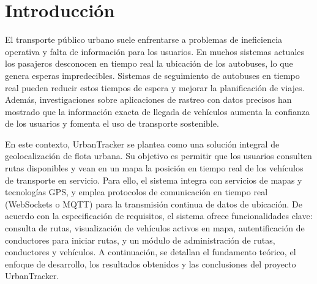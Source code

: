 \section{Introducción}
El transporte público urbano suele enfrentarse a problemas de ineficiencia operativa y falta de información para los usuarios. En muchos sistemas actuales los pasajeros desconocen en tiempo real la ubicación de los autobuses, lo que genera esperas impredecibles. Sistemas de seguimiento de autobuses en tiempo real pueden reducir estos tiempos de espera y mejorar la planificación de viajes. Además, investigaciones sobre aplicaciones de rastreo con datos precisos han mostrado que la información exacta de llegada de vehículos aumenta la confianza de los usuarios y fomenta el uso de transporte sostenible.

En este contexto, UrbanTracker se plantea como una solución integral de geolocalización de flota urbana. Su objetivo es permitir que los usuarios consulten rutas disponibles y vean en un mapa la posición en tiempo real de los vehículos de transporte en servicio. Para ello, el sistema integra con servicios de mapas y tecnologías GPS, y emplea protocolos de comunicación en tiempo real (WebSockets o MQTT) para la transmisión continua de datos de ubicación. De acuerdo con la especificación de requisitos, el sistema ofrece funcionalidades clave: consulta de rutas, visualización de vehículos activos en mapa, autentificación de conductores para iniciar rutas, y un módulo de administración de rutas, conductores y vehículos. A continuación, se detallan el fundamento teórico, el enfoque de desarrollo, los resultados obtenidos y las conclusiones del proyecto UrbanTracker.
